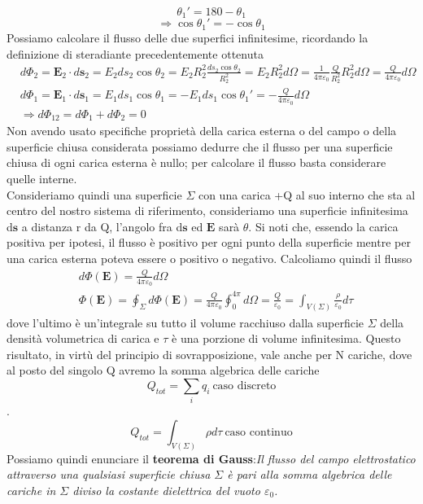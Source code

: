 \documentclass[
10pt, %
a4paper, %
oneside, %
headinclude,footinclude, %
BCOR5mm, %
]{scrartcl}
\begin{document}
\[\theta_1' = 180 - \theta_1\]
\[\Rightarrow \cos\theta_1' = -\cos\theta_1\]
Possiamo calcolare il flusso delle due superfici infinitesime, ricordando la definizione di steradiante precedentemente ottenuta
\begin{align*}
	&d\Phi_2 = \mathbf{E}_2\cdot d\mathbf{s}_2 = E_2 ds_2 \cos\theta_2 = E_2 R_2^2 \frac{ ds_2 \cos\theta_2}{R_2^2} = E_2 R_2^2 d\Omega =\frac{1}{4\pi\varepsilon_0}\frac{Q}{R^2_2}R^2_2 d\Omega= \frac{Q}{4\pi\varepsilon_0}d\Omega \\
	&d\Phi_1 = \mathbf{E}_1\cdot d\mathbf{s}_1 = E_1 ds_1 \cos\theta_1 = -E_1 ds_1 \cos\theta_1' = -\frac{Q}{4\pi\varepsilon_0}d\Omega\\
	&\Rightarrow d\Phi_{12} = d\Phi_1 + d\Phi_2 = 0
\end{align*}
Non avendo usato specifiche proprietà della carica esterna o del campo o della superficie chiusa considerata possiamo dedurre che il flusso per una superficie chiusa di ogni carica esterna è nullo; per calcolare il flusso basta considerare quelle interne.\\
Consideriamo quindi una superficie \(\Sigma\) con una carica +Q al suo interno che sta al centro del nostro sistema di riferimento, consideriamo una superficie infinitesima d$\mathbf{s}$ a distanza r da Q, l'angolo fra d$\mathbf{s}$ ed $\mathbf{E}$ sarà $\theta$. Si noti che, essendo la carica positiva per ipotesi, il flusso è positivo per ogni punto della superficie mentre per una carica esterna poteva essere o positivo o negativo. Calcoliamo quindi il flusso
\begin{align*}
	&d\Phi(\mathbf{E}) = \frac{Q}{4\pi\varepsilon_0}d\Omega\\
	&\Phi(\mathbf{E}) = \oint_{\Sigma} d\Phi(\mathbf{E}) = \frac{Q}{4\pi\varepsilon_0}\oint_0^{4\pi}d\Omega = \frac{Q}{\varepsilon_0} = \int_{V(\Sigma)}\frac{\rho}{\varepsilon_0}d\tau
	\end{align*}
dove l'ultimo è un'integrale su tutto il volume racchiuso dalla superficie $\Sigma$ della densità volumetrica di carica e $\tau$ è una porzione di volume infinitesima. Questo risultato, in virtù del principio di sovrapposizione, vale anche per N cariche, dove al posto del singolo Q avremo la somma algebrica delle cariche 
\[Q_{tot} = \sum_iq_i\ \text{caso discreto}\]. 
\[Q_{tot} = \int_{V(\Sigma)}\rho d\tau\ \text{caso continuo}\]
Possiamo quindi enunciare il \textbf{teorema di Gauss}:\textit{Il flusso del campo elettrostatico attraverso una qualsiasi superficie chiusa $\Sigma$ è pari alla somma algebrica delle cariche in \(\Sigma\) diviso la costante dielettrica del vuoto $\varepsilon_0$.}
\end{document}
